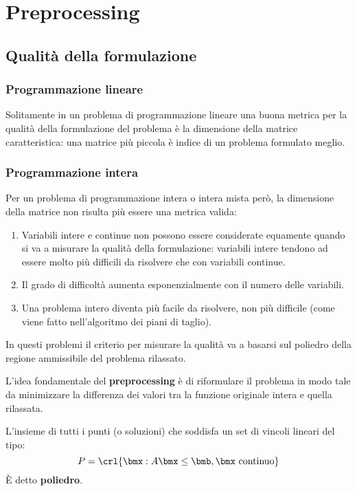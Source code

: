 \documentclass[\main/main.tex]{subfiles}
\begin{document}
\chapter{Preprocessing}
\section{Qualità della formulazione}
\subsection{Programmazione lineare}
Solitamente in un problema di programmazione lineare una buona metrica per la qualità della formulazione del problema è la dimensione della matrice caratteristica: una matrice più piccola è indice di un problema formulato meglio.

\subsection{Programmazione intera}
Per un problema di programmazione intera o intera mista però, la dimensione della matrice non risulta più essere una metrica valida:
\begin{enumerate}
    \item Variabili intere e continue non possono essere considerate equamente quando si va a misurare la qualità della formulazione: variabili intere tendono ad essere molto più difficili da risolvere che con variabili continue.
    \item Il grado di difficoltà aumenta esponenzialmente con il numero delle variabili.
    \item Una problema intero diventa più facile da risolvere, non più difficile (come viene fatto nell'algoritmo dei piani di taglio).
\end{enumerate}

In questi problemi il criterio per misurare la qualità va a basarsi sul poliedro della regione ammissibile del problema rilassato.

L'idea fondamentale del \textbf{preprocessing} è di riformulare il problema in modo tale da minimizzare la differenza dei valori tra la funzione originale intera e quella rilassata.

\begin{definition}[Poliedro]
    L'insieme di tutti i punti (o soluzioni) che soddisfa un set di vincoli lineari del tipo:
    \[
        P = \crl{\bmx: A\bmx \leq \bmb, \bmx \text{ continuo}}
    \]
    È detto \textbf{poliedro}.
\end{definition}
\end{document}
